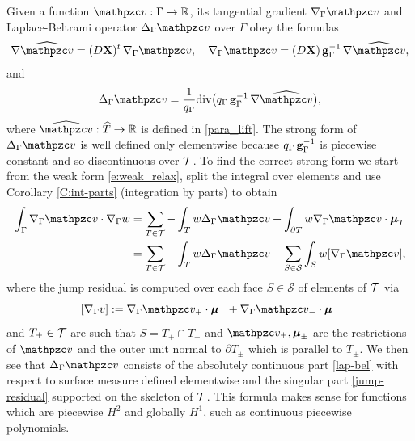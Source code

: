 Given a function $\tv:\Gamma\to\mathbb{R}$, its tangential gradient
$\nabla_\Gamma\tv$ and Laplace-Beltrami operator $\Delta_\Gamma \tv$ over $\Gamma$
obey the formulas
%
\begin{equation}\label{grad-Gamma}
  \nabla \widehat\tv = (D \bX)^t \, \nabla_{\Gamma} \tv, \quad
  \nabla_{\Gamma} \tv = (D \bX) \, \bg_\Gamma^{-1} \, \nabla \widehat\tv,
\end{equation}
and 
\begin{equation}\label{lap-bel}
\Delta_\Gamma \tv = \frac{1}{q_\Gamma} {\text{div}} 
\big(q_\Gamma  \, \bg_\Gamma^{-1} \, \nabla\widehat\tv \big),
\end{equation}
%
where $\widehat \tv:{\widehat{T}}\to\mathbb{R}$ is defined in \eqref{para_lift}.
The strong form of $\Delta_\Gamma \tv$ is well defined only elementwise because
$q_\Gamma  \, {\bf g}_\Gamma^{-1}$ is piecewise constant and so discontinuous over $\mathcal{T}$.
To find the correct strong form we start from the weak form \eqref{e:weak_relax},
split the integral over elements and use Corollary \ref{C:int-parts}
(integration by parts) to obtain
%
\begin{align*}
  \int_\Gamma \nabla_\Gamma \tv \cdot \nabla_\Gamma w & =
  \sum_{T\in\T} -\int_T w \Delta_\Gamma \tv +
  \int_{\partial T} w \nabla_\Gamma\tv\cdot\bmu_T
  \\
  & = \sum_{T\in\T} -\int_T w \Delta_\Gamma \tv +
  \sum_{S\in\mathcal{S}} \int_S w [\nabla_\Gamma \tv],
\end{align*}
%
where the jump residual is computed over each face $S\in\mathcal{S}$ of elements of $\mathcal{T}$
via
%
\begin{equation}\label{jump-residual}
  [\nabla_\Gamma v] := \nabla_\Gamma \tv_+ \cdot \bmu_+
    + \nabla_\Gamma \tv_- \cdot \bmu_-
\end{equation}
%
and $T_\pm \in\mathcal{T}$ are such that $S=T_+ \cap T_-$ and $\tv_\pm, \bmu_\pm$ are the
restrictions of $\tv$ and the outer unit normal to $\partial T_\pm$ which is parallel
to $T_\pm$. We then see that $\Delta_\Gamma \tv$ consists of the absolutely
continuous part \eqref{lap-bel} with respect to surface measure defined elementwise
and the singular part \eqref{jump-residual} supported on the skeleton of $\mathcal{T}$. This
formula makes sense for functions which are piecewise $H^2$ and globally $H^1$, such
as continuous piecewise polynomials.


